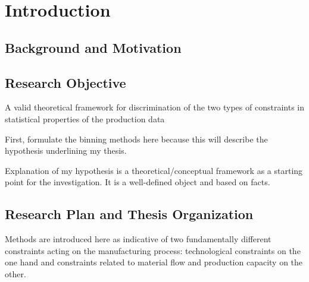 \chapter{Introduction}

\section{Background and Motivation}
\clearpage
\section{Research Objective}

{\color{red} 
	
	A valid theoretical framework for discrimination of the two types of constraints in statistical properties of the production data
	
	First, formulate the binning methods here because this will describe the hypothesis underlining my thesis.
	
	Explanation of my hypothesis is a theoretical/conceptual framework as a starting point for the investigation. It is a well-defined object and based on facts.
	
}

\section{Research Plan and Thesis Organization}

{\color{red} 
	
	Methods are introduced here as indicative of two fundamentally different constraints acting on the manufacturing process: technological constraints on the one hand and constraints related to material flow and production capacity on the other.
	
}